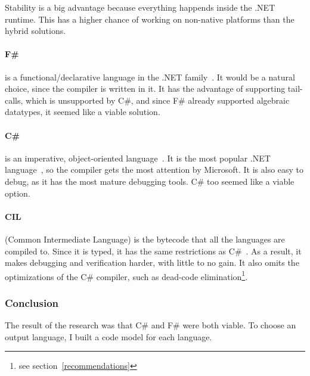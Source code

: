 Stability is a big advantage because everything happends inside the .NET runtime.
This has a higher chance of working on non-native platforms than the hybrid solutions.

\paragraph{F\#} is a functional/declarative language in the .NET family~\cite{smith}.
It would be a natural choice, since the compiler is written in it.
It has the advantage of supporting tail-calls, which is unsupported by C\#,
  and since F\# already supported algebraic datatypes, it seemed like a viable solution.


\paragraph{C\#}
is an imperative, object-oriented language~\cite{ecma334}.
It is the most popular .NET language~\cite{Meyerovich}, so the compiler gets the most attention by Microsoft.
It is also easy to debug, as it has the most mature debugging tools.
C\# too seemed like a viable option.


\paragraph{CIL}
(Common Intermediate Language) is the bytecode that all the languages are compiled to.
Since it is typed, it has the same restrictions as C\#~\cite{ecma335}.
As a result, it makes debugging and verification harder, with little to no gain.
It also omits the optimizations of the C\# compiler, such as dead-code elimination\footnote{see section~\ref{recommendations}}.

\subsubsection{Conclusion}
The result of the research was that C\# and F\# were both viable.
To choose an output language, I built a code model for each language.

